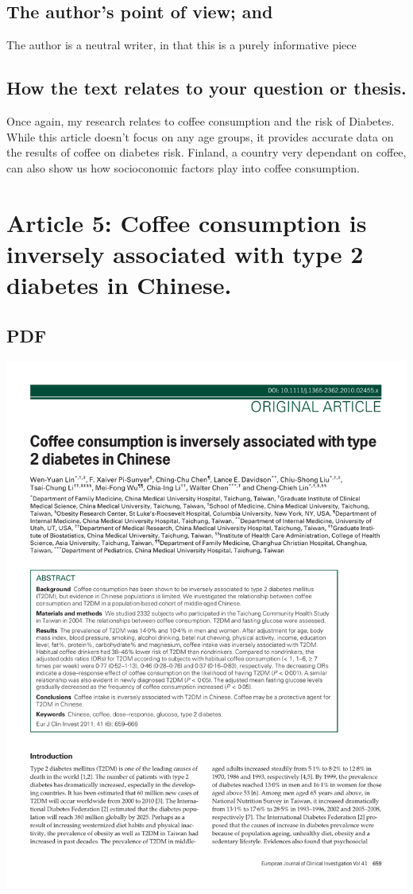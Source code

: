 \documentclass{scrartcl}
\begin{document}
\subsection{The author’s point of view; and}
\label{sec:org447e950}
The author is a neutral writer, in that this is a purely informative piece
\subsection{How the text relates to your question or thesis.}
\label{sec:org280e45f}
Once again, my research relates to coffee consumption and the risk of Diabetes. While this article doesn't focus on any age groups, it provides accurate data on the results of coffee on diabetes risk. Finland, a country very dependant on coffee, can also show us how socioconomic factors play into coffee consumption.
\section{Article 5: Coffee consumption is inversely associated with type 2 diabetes in Chinese.}
\label{sec:org1edae3c}
\subsection{PDF}
\label{sec:orgaae1209}
\begin{center}
\includegraphics[width=.9\linewidth]{./citations/CoffeeInverseChinese.pdf}
\end{center}
\end{document}
